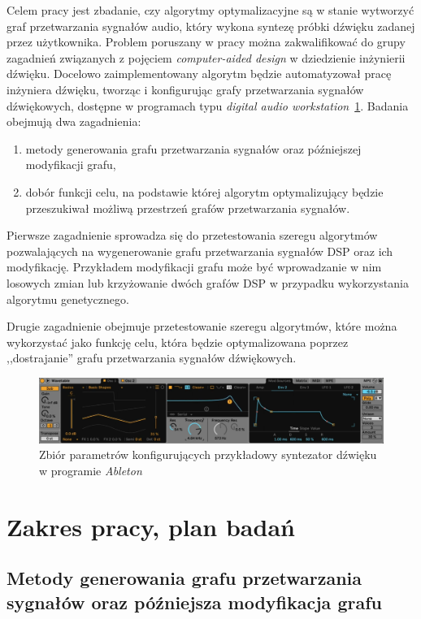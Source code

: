 Celem pracy jest zbadanie, czy algorytmy optymalizacyjne są w stanie
wytworzyć graf przetwarzania sygnałów audio, który wykona syntezę próbki
dźwięku zadanej przez użytkownika.
Problem poruszany w pracy można zakwalifikować do grupy zagadnień związanych
z pojęciem \textit{computer-aided design} w dziedzienie inżynierii dźwięku. Docelowo
zaimplementowany algorytm będzie automatyzował pracę inżyniera dźwięku,
tworząc i konfigurując grafy przetwarzania sygnałów dźwiękowych, dostępne w
programach typu \textit{digital audio workstation}~\ref{fig:ableton_patch}. Badania obejmują dwa zagadnienia:
\begin{enumerate} \label{research_types}
    \item metody generowania grafu przetwarzania sygnałów oraz późniejszej modyfikacji grafu,
    \item dobór funkcji celu, na podstawie której algorytm optymalizujący będzie przeszukiwał
możliwą przestrzeń grafów przetwarzania sygnałów.
\end{enumerate}

Pierwsze zagadnienie sprowadza się do przetestowania szeregu algorytmów pozwalających na wygenerowanie
grafu przetwarzania sygnałów DSP oraz ich modyfikację. Przykładem modyfikacji grafu
może być wprowadzanie w nim losowych zmian lub krzyżowanie dwóch grafów DSP w przypadku
wykorzystania algorytmu genetycznego.

Drugie zagadnienie obejmuje przetestowanie szeregu algorytmów, które można wykorzystać jako funkcję celu,
która będzie optymalizowana poprzez ,,dostrajanie'' grafu przetwarzania sygnałów dźwiękowych.

\begin{figure}[H]
    \centering
    \includegraphics[width=0.8\linewidth]{rys01/ableton_patch.jpg}
    \caption{
      Zbiór parametrów konfigurujących przykładowy syntezator dźwięku w programie \textit{Ableton}}
    \label{fig:ableton_patch}
\end{figure}


\section{Zakres pracy, plan badań}

\subsection{Metody generowania grafu przetwarzania sygnałów oraz późniejsza modyfikacja grafu}


